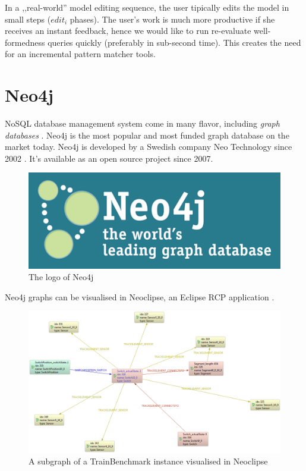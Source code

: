 In a ,,real-world'' model editing sequence, the user tipically edits the model in small steps ($edit_i$ phases). The user's work is much more productive if she receives an instant feedback, hence we would like to run re-evaluate well-formedness queries quickly (preferably in sub-second time). This creates the need for an incremental pattern matcher tools.

\section{Neo4j}

NoSQL database management system come in many flavor, including \textit{graph databases} \cite{NoSQL}. Neo4j is the most popular and most funded graph database on the market today. Neo4j is developed by a Swedish company Neo Technology since 2002 \cite{neo4j}. It's available as an open source project since 2007.

\begin{figure}
\begin{center}
\includegraphics[]{figures/neo4j-logo}
\caption{The logo of Neo4j}
\label{fig:neo4j-logo}
\end{center}
\end{figure}

Neo4j graphs can be visualised in Neoclipse, an Eclipse RCP application \cite{Neoclipse}.

\begin{figure}
\begin{center}
\includegraphics[width=14cm]{figures/neoclipse-graph}
\caption{A subgraph of a TrainBenchmark instance visualised in Neoclipse}
\label{fig:neoclipse}
\end{center}
\end{figure}


